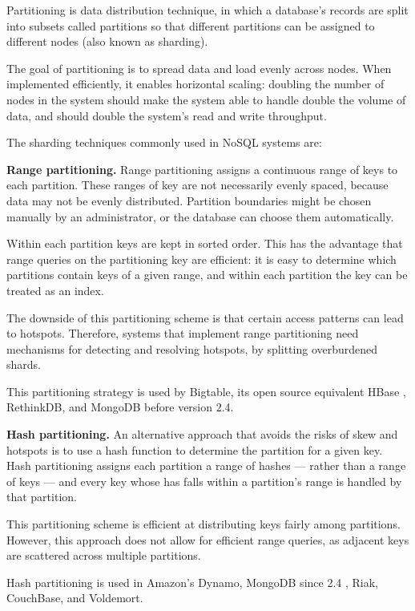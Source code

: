 Partitioning is data distribution technique, in which a database's records are split into subsets called partitions so
that different partitions can be assigned to different nodes (also known as sharding).

The goal of partitioning is to spread data and load evenly across nodes.
When implemented efficiently, it enables horizontal scaling:
doubling the number of nodes in the system should make the system able to handle double the volume of data, and
should double the system's read and write throughput.

The sharding techniques commonly used in NoSQL systems are:

\bigskip
\noindent
\textbf{Range partitioning.}
Range partitioning assigns a continuous range of keys to each partition.
These ranges of key are not necessarily evenly spaced, because data may not be evenly distributed.
Partition boundaries might be chosen manually by an administrator, or the database can choose them automatically.

Within each partition keys are kept in sorted order.
This has the advantage that range queries on the partitioning key are efficient:
it is easy to determine which partitions contain keys of a given range, and within each partition the key can be treated
as an index.

The downside of this partitioning scheme is that certain access patterns can lead to hotspots.
Therefore, systems that implement range partitioning need mechanisms for detecting and resolving hotspots, by splitting
overburdened shards.

This partitioning strategy is used by Bigtable, its open source equivalent HBase \cite{hbasebigtable:comparison}, RethinkDB,
and MongoDB before version 2.4.

\bigskip
\noindent
\textbf{Hash partitioning.}
An alternative approach that avoids the risks of skew and hotspots is to use a hash function to determine the partition
for a given key.
Hash partitioning assigns each partition a range of hashes --- rather than a range of keys --- and every key whose has
falls within a partition's range is handled by that partition.

This partitioning scheme is efficient at distributing keys fairly among partitions.
However, this approach does not allow for efficient range queries, as adjacent keys are scattered across multiple
partitions.

Hash partitioning is used in Amazon's Dynamo, MongoDB since 2.4 \cite{mongo:hashpartitioning}, Riak, CouchBase,
and Voldemort.


